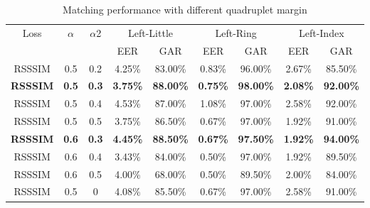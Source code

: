 \begin{table}[ht]
    \centering
    \caption{Matching performance with different quadruplet margin}
    \begin{tabular}{ccccccccc}
    \hline
    \multirow{2}{*}{Loss} & \multirow{2}{*}{$\alpha$} & \multirow{2}{*}{$\alpha$2} & \multicolumn{2}{c}{Left-Little}    & \multicolumn{2}{c}{Left-Ring}      & \multicolumn{2}{c}{Left-Index}     \\
                          &                         &                         & EER             & GAR              & EER             & GAR              & EER             & GAR              \\ \hline
    RSSSIM                & 0.5                     & 0.2                     & 4.25\%          & 83.00\%          & 0.83\%          & 96.00\%          & 2.67\%          & 85.50\%          \\
    \textbf{RSSSIM}       & \textbf{0.5}            & \textbf{0.3}            & \textbf{3.75\%} & \textbf{88.00\%} & \textbf{0.75\%} & \textbf{98.00\%} & \textbf{2.08\%} & \textbf{92.00\%} \\
    RSSSIM                & 0.5                     & 0.4                     & 4.53\%          & 87.00\%          & 1.08\%          & 97.00\%          & 2.58\%          & 92.00\%          \\
    RSSSIM                & 0.5                     & 0.5                     & 3.75\%          & 86.50\%          & 0.67\%          & 97.00\%          & 1.92\%          & 91.00\%          \\
    \textbf{RSSSIM}       & \textbf{0.6}            & \textbf{0.3}            & \textbf{4.45\%} & \textbf{88.50\%} & \textbf{0.67\%} & \textbf{97.50\%} & \textbf{1.92\%} & \textbf{94.00\%} \\
    RSSSIM                & 0.6                     & 0.4                     & 3.43\%          & 84.00\%          & 0.50\%          & 97.00\%          & 1.92\%          & 89.50\%          \\
    RSSSIM                & 0.6                     & 0.5                     & 4.00\%          & 68.00\%          & 0.50\%          & 89.50\%          & 2.00\%          & 84.00\%          \\
    RSSSIM                & 0.5                     & 0                       & 4.08\%          & 85.50\%          & 0.67\%          & 97.00\%          & 2.58\%          & 91.00\%          \\ \hline
    \end{tabular}
    \label{quadruplet}
\end{table}


